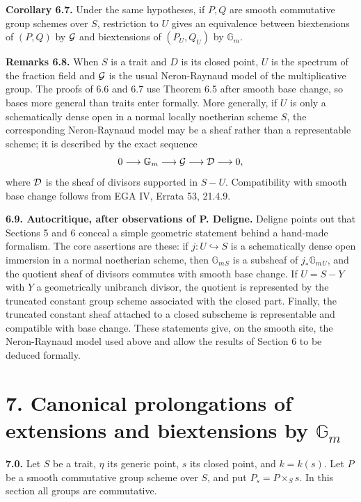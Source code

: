 \documentclass[11pt]{article}
\providecommand{\Gm}{\mathbb G_m}
\begin{document}
\textbf{Corollary 6.7.}  Under the same hypotheses, if \(P,Q\) are smooth commutative group schemes over \(S\), restriction to \(U\) gives an equivalence between biextensions of \((P,Q)\) by \(\mathcal G\) and biextensions of \((P_U,Q_U)\) by \(\Gm\).

\textbf{Remarks 6.8.}  When \(S\) is a trait and \(D\) is its closed point, \(U\) is the spectrum of the fraction field and \(\mathcal G\) is the usual Neron-Raynaud model of the multiplicative group.  The proofs of 6.6 and 6.7 use Theorem 6.5 after smooth base change, so bases more general than traits enter formally.  More generally, if \(U\) is only a schematically dense open in a normal locally noetherian scheme \(S\), the corresponding Neron-Raynaud model may be a sheaf rather than a representable scheme; it is described by the exact sequence
\[
  0\longrightarrow \Gm\longrightarrow \cG\longrightarrow \cD\longrightarrow 0,
\]
where \(\mathcal D\) is the sheaf of divisors supported in \(S-U\).  Compatibility with smooth base change follows from EGA IV, Errata 53, 21.4.9.

\textbf{6.9. Autocritique, after observations of P. Deligne.}  Deligne points out that Sections 5 and 6 conceal a simple geometric statement behind a hand-made formalism.  The core assertions are these: if \(j:U\hookrightarrow S\) is a schematically dense open immersion in a normal noetherian scheme, then \(\Gm{}_{S}\) is a subsheaf of \(j_*\Gm{}_{U}\), and the quotient sheaf of divisors commutes with smooth base change.  If \(U=S-Y\) with \(Y\) a geometrically unibranch divisor, the quotient is represented by the truncated constant group scheme associated with the closed part.  Finally, the truncated constant sheaf attached to a closed subscheme is representable and compatible with base change.  These statements give, on the smooth site, the Neron-Raynaud model used above and allow the results of Section 6 to be deduced formally.

\section*{7. Canonical prolongations of extensions and biextensions by \(\Gm\)}

\textbf{7.0.}  Let \(S\) be a trait, \(\eta\) its generic point, \(s\) its closed point, and \(k=k(s)\).  Let \(P\) be a smooth commutative group scheme over \(S\), and put \(P_s=P\times_S s\).  In this section all groups are commutative.
\end{document}
